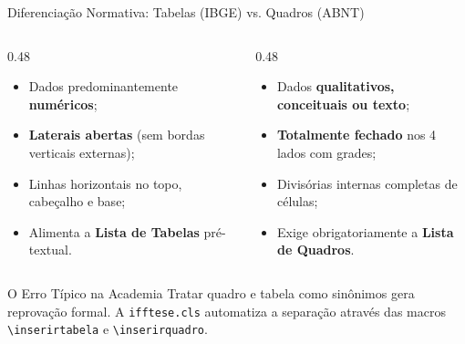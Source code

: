 \documentclass[aspectratio=169, 10pt]{beamer}
\begin{document}
\begin{frame}{Diferenciação Normativa: Tabelas (IBGE) vs. Quadros (ABNT)}
  \begin{columns}[T]
    \begin{column}{0.48\textwidth}
      \begin{tcolorbox}[colback=iffgreenlight,colframe=iffprimary,arc=1.5mm,title=\textbf{Tabelas (Normas do IBGE)}]
        \scriptsize
        \begin{itemize}\setlength{\itemsep}{1.5pt}
          \item Dados predominantemente \textbf{numéricos};
          \item \textbf{Laterais abertas} (sem bordas verticais externas);
          \item Linhas horizontais no topo, cabeçalho e base;
          \item Alimenta a \textbf{Lista de Tabelas} pré-textual.
        \end{itemize}
      \end{tcolorbox}
    \end{column}

    \begin{column}{0.48\textwidth}
      \begin{tcolorbox}[colback=iffalertbg,colframe=iffred,arc=1.5mm,title=\textbf{Quadros (Norma ABNT)}]
        \scriptsize
        \begin{itemize}\setlength{\itemsep}{1.5pt}
          \item Dados \textbf{qualitativos, conceituais ou texto};
          \item \textbf{Totalmente fechado} nos 4 lados com grades;
          \item Divisórias internas completas de células;
          \item Exige obrigatoriamente a \textbf{Lista de Quadros}.
        \end{itemize}
      \end{tcolorbox}
    \end{column}
  \end{columns}
  \vspace{0.08cm}
  \begin{alertblock}{O Erro Típico na Academia}
    \tiny Tratar quadro e tabela como sinônimos gera reprovação formal. A \texttt{ifftese.cls} automatiza a separação através das macros \texttt{\textbackslash inserirtabela} e \texttt{\textbackslash inserirquadro}.
  \end{alertblock}
\end{frame}
\end{document}
